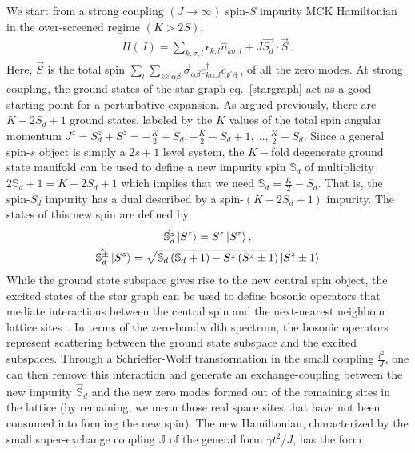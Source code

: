 \documentclass[reprint,prb,superscriptaddress]{revtex4-2}
\begin{document}
We start from a strong coupling \((J \to \infty)\) spin-\(S\) impurity MCK Hamiltonian in the over-screened regime \(\left( K > 2S \right) \),
\begin{equation}\begin{aligned}
	\label{strong_ham}
	H(J) = \sum_{k,\sigma,l}\epsilon_{k,l} \hat n_{k\sigma,l} + J \vec{S_d}\cdot\vec{S}~.
\end{aligned}\end{equation}
Here, \(\vec S\) is the total spin \(\sum_l \sum_{kk^\prime \alpha\beta} \vec \sigma_{\alpha\beta}c^\dagger_{k\alpha,l}c_{k^\prime\beta,l}\) of all the zero modes. At strong coupling, the ground states of the star graph eq.~\ref{stargraph} act as a good starting point for a perturbative expansion. As argued previously, there are \(K-2S_d+1\) ground states, labeled by the \(K\) values of the total spin angular momentum \(J^z = S_d^z + S^z = -\frac{K}{2} + S_d, -\frac{K}{2} + S_d + 1, \ldots, \frac{K}{2} - S_d\). Since a general spin-\(s\) object is simply a \(2s+1\) level system, the \(K-\)fold degenerate ground state manifold can be used to define a new impurity spin \(\mathbb{S}_d\) of multiplicity \(2\mathbb{S}_d + 1 = K-2S_d+1\) which implies that we need \(\mathbb{S}_d = \frac{K}{2} - S_d\). That is, the spin-\(S_d\) impurity has a dual described by a spin-\((K-2S_d+1)\) impurity. The states of this new spin are defined by
\begin{gather}
	\hat{\mathbb{S}_d^z} \ket{S^z} = S^z \ket{S^z},\nonumber\\
	\hat{\mathbb{S}_d^\pm} \ket{S^z} = \sqrt{\mathbb{S}_d\left( \mathbb{S}_d + 1 \right) - S^z\left( S^z \pm 1\right)} \ket{S^z \pm 1}
\end{gather}
While the ground state subspace gives rise to the new central spin object, the excited states of the star graph can be used to define bosonic operators that mediate interactions between the central spin and the next-nearest neighbour lattice sites~\cite{kroha_kolf_2007}. In terms of the zero-bandwidth spectrum, the bosonic operators represent scattering between the ground state subspace and the excited subspaces. Through a Schrieffer-Wolff transformation in the small coupling \(\frac{t^2}{J}\), one can then remove this interaction and generate an exchange-coupling between the new impurity \(\vec {\mathbb{S}}_d\) and the new zero modes formed out of the remaining sites in the lattice \cite{kroha_kolf_2007} (by remaining, we mean those real space sites that have not been consumed into forming the new spin). The new Hamiltonian, characterized by the small super-exchange  coupling \(\mathbb{J}\) of the general form \(\gamma t^2/J\), has the form
\end{document}
